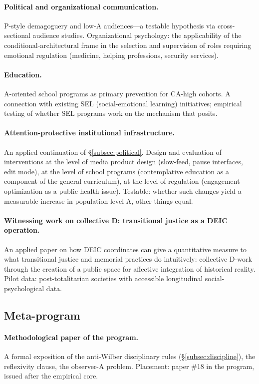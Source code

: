 \paragraph{Political and organizational communication.} P-style demagoguery and low-A audiences---a testable hypothesis via cross-sectional audience studies. Organizational psychology: the applicability of the conditional-architectural frame in the selection and supervision of roles requiring emotional regulation (medicine, helping professions, security services).

\paragraph{Education.} A-oriented school programs as primary prevention for CA-high cohorts. A connection with existing SEL (social-emotional learning) initiatives; empirical testing of whether SEL programs work on the mechanism that \DEIC{} posits.

\paragraph{Attention-protective institutional infrastructure.} An applied continuation of §\ref{subsec:political}. Design and evaluation of interventions at the level of media product design (slow-feed, pause interfaces, edit mode), at the level of school programs (contemplative education as a component of the general curriculum), at the level of regulation (engagement optimization as a public health issue). Testable: whether such changes yield a measurable increase in population-level A, other things equal.

\paragraph{Witnessing work on collective D: transitional justice as a DEIC operation.} An applied paper on how DEIC coordinates can give a quantitative measure to what transitional justice and memorial practices do intuitively: collective D-work through the creation of a public space for affective integration of historical reality. Pilot data: post-totalitarian societies with accessible longitudinal social-psychological data.

\subsection{Meta-program}

\paragraph{Methodological paper of the program.} A formal exposition of the anti-Wilber disciplinary rules (§\ref{subsec:discipline}), the reflexivity clause, the observer-A problem. Placement: paper \#18 in the program, issued after the empirical core.

